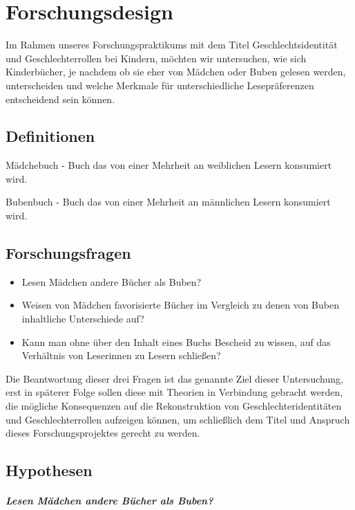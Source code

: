 \chapter{Forschungsdesign}

Im Rahmen unseres Forschungspraktikums mit dem Titel
Geschlechtsidentität und Geschlechterrollen bei Kindern, möchten wir
untersuchen, wie sich Kinderbücher, je nachdem ob sie eher von Mädchen
oder Buben gelesen werden, unterscheiden und welche Merkmale für
unterschiedliche Lesepräferenzen entscheidend sein können.

\section{Definitionen}

Mädchebuch - Buch das von einer Mehrheit an weiblichen Lesern konsumiert
wird.

Bubenbuch - Buch das von einer Mehrheit an männlichen Lesern konsumiert
wird.

\section{Forschungsfragen}

\begin{itemize}
\item
  Lesen Mädchen andere Bücher als Buben?
\item
  Weisen von Mädchen favorisierte Bücher im Vergleich zu denen von Buben
  inhaltliche Unterschiede auf?
\item
  Kann man ohne über den Inhalt eines Buchs Bescheid zu wissen, auf das
  Verhältnis von Leserinnen zu Lesern schließen?
\end{itemize}

Die Beantwortung dieser drei Fragen ist das genannte Ziel dieser
Untersuchung, erst in späterer Folge sollen diese mit Theorien in
Verbindung gebracht werden, die mögliche Konsequenzen auf die
Rekonstruktion von Geschlechteridentitäten und Geschlechterrollen
aufzeigen können, um schließlich dem Titel und Anspruch dieses
Forschungsprojektes gerecht zu werden.

\section{Hypothesen}

\paragraph{Lesen Mädchen andere Bücher als Buben?}

